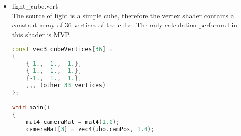 \begin{itemize}
\begin{lstlisting}[language=c++, caption=Grid fragment shader(./assets/shaders/grid.frag)]
float log10(float x)
{
    return log(x) / log(10.0);
}

float satf(float x)
{
    return clamp(x, 0.0, 1.0);
}

vec2 satv(vec2 x)
{
    return clamp(x, vec2(0.0), vec2(1.0));
}

float max2(vec2 v)
{
    return max(v.x, v.y);
}

vec4 gridColor(vec2 uv, vec2 camPos)
{
    vec2 dudv = vec2(
        length(vec2(dFdx(uv.x), dFdy(uv.x))),
        length(vec2(dFdx(uv.y), dFdy(uv.y)))
    );

    float lodLevel = max(0.0, log10((length(dudv) * gridMinPixelsBetweenCells) / gridCellSize) + 1.0);
    float lodFade = fract(lodLevel);

    float lod0 = gridCellSize * pow(10.0, floor(lodLevel));
    float lod1 = lod0 * 10.0;
    float lod2 = lod1 * 10.0;

    dudv *= 4.0;

    float lod0a = max2(vec2(1.0) - abs(satv(mod(uv, lod0) / dudv) * 2.0 - vec2(1.0)));
    float lod1a = max2(vec2(1.0) - abs(satv(mod(uv, lod1) / dudv) * 2.0 - vec2(1.0)));
    float lod2a = max2(vec2(1.0) - abs(satv(mod(uv, lod2) / dudv) * 2.0 - vec2(1.0)));

    uv -= camPos;

    vec4 c = lod2a > 0.0 ? gridColorThick : lod1a > 0.0 ? mix(gridColorThick, gridColorThin, lodFade) : gridColorThin;

    float opacityFalloff = (1.0 - satf(length(uv) / gridSize));

    c.a *= (lod2a > 0.0 ? lod2a : lod1a > 0.0 ? lod1a : (lod0a * (1.0-lodFade))) * opacityFalloff;

    return c;
}

void main()
{
    outColor = gridColor(uv, camPos);
}
\end{lstlisting}
    \item light\_cube.vert\\
    The source of light is a simple cube, therefore the vertex shader contains a constant array of 36 vertices of the cube. The only calculation performed in this shader is MVP.
\begin{lstlisting}[language=c++, caption=Light cube vertex shader(./assets/shaders/light\_cube.vert)]
const vec3 cubeVertices[36] =
{
    {-1., -1., -1.},
    {-1., -1.,  1.},
    {-1.,  1.,  1.},
    ,,, (other 33 vertices)
};

void main()
{
    mat4 cameraMat = mat4(1.0);
    cameraMat[3] = vec4(ubo.camPos, 1.0);


\end{lstlisting}
\end{itemize}
